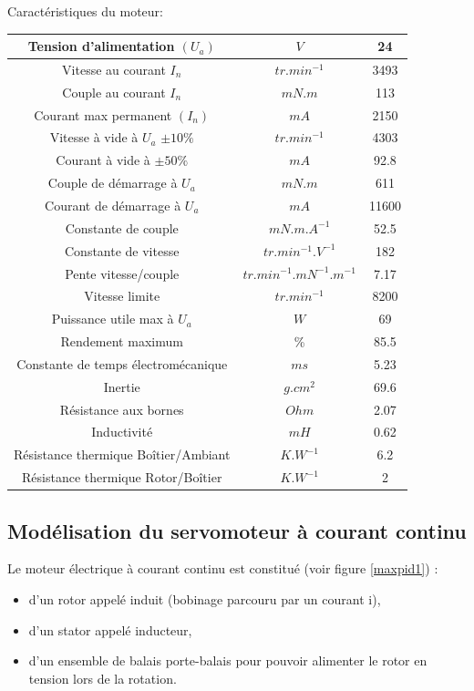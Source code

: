 Caractéristiques du moteur:
\begin{center}
\begin{tabular}{|c|c|c|}
\hline
Tension d'alimentation $(U_a)$ & $V$ & 24 \\
\hline
Vitesse au courant $I_n$ & $tr.min^{-1}$ & 3493 \\
\hline
Couple au courant $I_n$ & $mN.m$ & 113 \\
\hline
Courant max permanent $(I_n)$ & $mA$ & 2150 \\
\hline
Vitesse à vide à $U_a$ $\pm 10\%$ & $tr.min^{-1}$ & 4303 \\
\hline
Courant à vide à $\pm 50\%$ & $mA$ & 92.8 \\
\hline
Couple de démarrage à $U_a$ & $mN.m$ & 611\\
\hline
Courant de démarrage à $U_a$ & $mA$ &  11600 \\
\hline
Constante de couple & $mN.m.A^{-1}$ & 52.5 \\
\hline
Constante de vitesse & $tr.min^{-1}.V^{-1}$ & 182 \\
\hline
Pente vitesse/couple & $tr.min^{-1}.mN^{-1}.m^{-1}$ & 7.17 \\
\hline
Vitesse limite & $tr.min^{-1}$ & 8200 \\
\hline
Puissance utile max à $U_a$ & $W$ & 69 \\
\hline
Rendement maximum & \% & 85.5 \\
\hline
Constante de temps électromécanique & $ms$ & 5.23 \\
\hline
Inertie & $g.cm^2$ & 69.6 \\
\hline
Résistance aux bornes & $Ohm$ & 2.07 \\
\hline
Inductivité & $mH$ & 0.62 \\
\hline
Résistance thermique Boîtier/Ambiant & $K.W^{-1}$ & 6.2 \\
\hline
Résistance thermique Rotor/Boîtier & $K.W^{-1}$ & 2 \\
\hline
\end{tabular}
\end{center}

\subsection{Modélisation du servomoteur à courant continu}

Le moteur électrique à courant continu est constitué (voir figure \ref{maxpid1}) :
\begin{itemize}
 \item d'un rotor appelé induit (bobinage parcouru par un courant i),
 \item d'un stator appelé inducteur,
 \item d'un ensemble de balais porte-balais pour pouvoir alimenter le rotor en tension lors
de la rotation.
\end{itemize}

